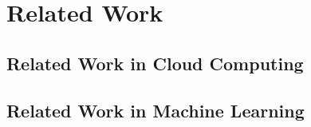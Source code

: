 \chapter{Related Work}\label{ch:background-literature}
\section{Related Work in Cloud Computing}\label{sec:related-work-in-cloud-computing}

\section{Related Work in Machine Learning}\label{sec:related-work-in-machine-learning}